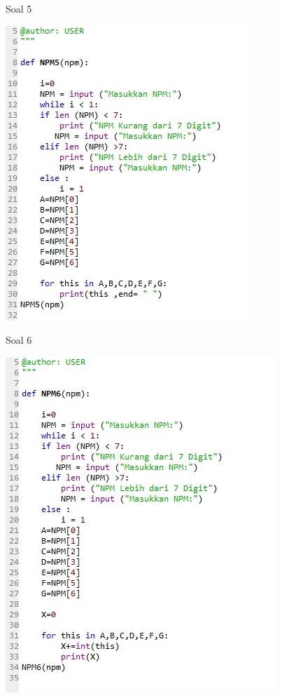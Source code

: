 \documentclass[a4paper,12pt]{report}
\begin{document}
\item Soal 5
    \begin{center}
    \includegraphics[width=11cm\textwidth]{Ketrampilan/5.jpg}
    \end{center}
\item Soal 6
    \begin{center}
    \includegraphics[width=11cm\textwidth]{Ketrampilan/6.jpg}
    \end{center}
\end{document}
